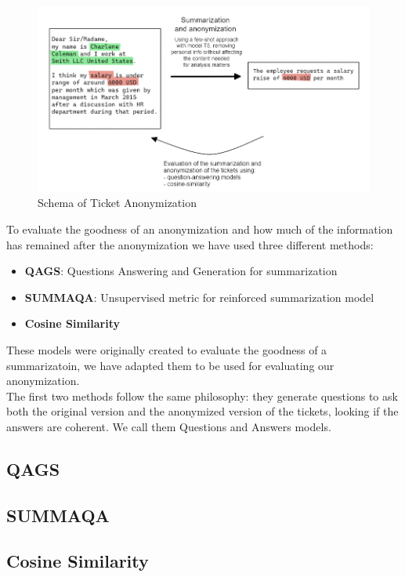 \begin{figure}[h] 
    \includegraphics[width=\textwidth]{images/ticket_anonymization_schema.png}
    \caption{Schema of Ticket Anonymization}
    \label{fig:schema_ticket_anonymization}
\end{figure}    
To evaluate the goodness of an anonymization and how much of the information has remained after the anonymization we have used three different methods:
\begin{itemize}
    \item \textbf{QAGS}: Questions Answering and Generation for summarization
    \item \textbf{SUMMAQA}: Unsupervised metric for reinforced summarization model 
    \item \textbf{Cosine Similarity}
\end{itemize}  
These models were originally created to evaluate the goodness of a summarizatoin, we have adapted them to be used for evaluating our anonymization. \\
The first two methods follow the same philosophy: they generate questions to ask both the original version and the anonymized version of the tickets, looking if the answers are coherent. We call them Questions and Answers models.

\subsection*{QAGS}
\subsection*{SUMMAQA}
\subsection*{Cosine Similarity}

